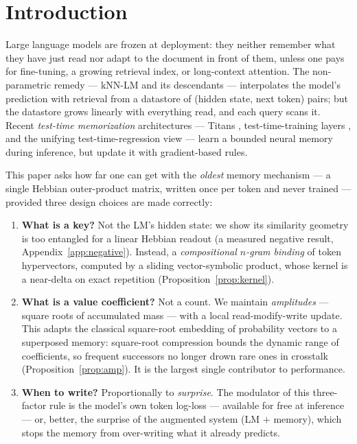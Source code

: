 \documentclass[11pt]{article}
\begin{document}
\section{Introduction}

Large language models are frozen at deployment: they neither remember what they have just read nor adapt to the document in front of them, unless one pays for fine-tuning, a growing retrieval index, or long-context attention. The non-parametric remedy --- kNN-LM \cite{khandelwal2020} and its descendants --- interpolates the model's prediction with retrieval from a datastore of (hidden state, next token) pairs; but the datastore grows linearly with everything read, and each query scans it. Recent \emph{test-time memorization} architectures --- Titans \cite{titans}, test-time-training layers \cite{ttt}, and the unifying test-time-regression view \cite{ttr} --- learn a bounded neural memory during inference, but update it with gradient-based rules.

This paper asks how far one can get with the \emph{oldest} memory mechanism --- a single Hebbian outer-product matrix, written once per token and never trained --- provided three design choices are made correctly:

\begin{enumerate}[leftmargin=1.4em,itemsep=2pt]
\item \textbf{What is a key?} Not the LM's hidden state: we show its similarity geometry is too entangled for a linear Hebbian readout (a measured negative result, Appendix~\ref{app:negative}). Instead, a \emph{compositional $n$-gram binding} of token hypervectors, computed by a sliding vector-symbolic product, whose kernel is a near-delta on exact repetition (Proposition~\ref{prop:kernel}).
\item \textbf{What is a value coefficient?} Not a count. We maintain \emph{amplitudes} --- square roots of accumulated mass --- with a local read-modify-write update. This adapts the classical square-root embedding of probability vectors \cite{bhatta43,rootsift,jebara} to a superposed memory: square-root compression bounds the dynamic range of coefficients, so frequent successors no longer drown rare ones in crosstalk (Proposition~\ref{prop:amp}). It is the largest single contributor to performance.
\item \textbf{When to write?} Proportionally to \emph{surprise}. The modulator of this three-factor rule \cite{fremaux,izhikevich} is the model's own token log-loss --- available for free at inference --- or, better, the surprise of the augmented system (LM $+$ memory), which stops the memory from over-writing what it already predicts.
\end{enumerate}
\end{document}
